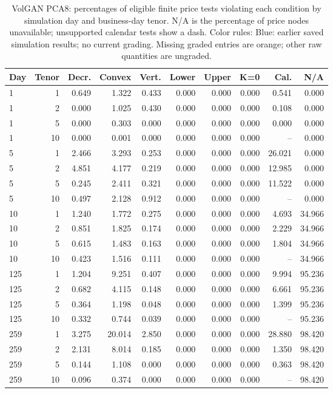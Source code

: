 \documentclass[11pt]{article}
\begin{document}
\begin{table}[H]\centering\small\setlength{\tabcolsep}{4pt}
\caption{VolGAN PCA8: percentages of eligible finite price tests violating each condition by simulation day and business-day tenor. N/A is the percentage of price nodes unavailable; unsupported calendar tests show a dash. Color rules: Blue: earlier saved simulation results; no current grading. Missing graded entries are orange; other raw quantities are ungraded.}\label{tab:literature-static-volgan}
\begin{tabular}{@{}lrrrrrrrrr@{}}
\toprule
Day & Tenor & Decr. & Convex & Vert. & Lower & Upper & K=0 & Cal. & N/A \\
\midrule
1 & 1 & 0.649 & 1.322 & 0.433 & 0.000 & 0.000 & 0.000 & 0.541 & 0.000 \\
1 & 2 & 0.000 & 1.025 & 0.430 & 0.000 & 0.000 & 0.000 & 0.108 & 0.000 \\
1 & 5 & 0.000 & 0.303 & 0.000 & 0.000 & 0.000 & 0.000 & 0.000 & 0.000 \\
1 & 10 & 0.000 & 0.001 & 0.000 & 0.000 & 0.000 & 0.000 & -- & 0.000 \\
5 & 1 & 2.466 & 3.293 & 0.253 & 0.000 & 0.000 & 0.000 & 26.021 & 0.000 \\
5 & 2 & 4.851 & 4.177 & 0.219 & 0.000 & 0.000 & 0.000 & 12.985 & 0.000 \\
5 & 5 & 0.245 & 2.411 & 0.321 & 0.000 & 0.000 & 0.000 & 11.522 & 0.000 \\
5 & 10 & 0.497 & 2.128 & 0.912 & 0.000 & 0.000 & 0.000 & -- & 0.000 \\
10 & 1 & 1.240 & 1.772 & 0.275 & 0.000 & 0.000 & 0.000 & 4.693 & 34.966 \\
10 & 2 & 0.851 & 1.825 & 0.174 & 0.000 & 0.000 & 0.000 & 2.229 & 34.966 \\
10 & 5 & 0.615 & 1.483 & 0.163 & 0.000 & 0.000 & 0.000 & 1.804 & 34.966 \\
10 & 10 & 0.423 & 1.516 & 0.111 & 0.000 & 0.000 & 0.000 & -- & 34.966 \\
125 & 1 & 1.204 & 9.251 & 0.407 & 0.000 & 0.000 & 0.000 & 9.994 & 95.236 \\
125 & 2 & 0.682 & 4.115 & 0.148 & 0.000 & 0.000 & 0.000 & 6.661 & 95.236 \\
125 & 5 & 0.364 & 1.198 & 0.048 & 0.000 & 0.000 & 0.000 & 1.399 & 95.236 \\
125 & 10 & 0.332 & 0.744 & 0.039 & 0.000 & 0.000 & 0.000 & -- & 95.236 \\
259 & 1 & 3.275 & 20.014 & 2.850 & 0.000 & 0.000 & 0.000 & 28.880 & 98.420 \\
259 & 2 & 2.131 & 8.014 & 0.185 & 0.000 & 0.000 & 0.000 & 1.350 & 98.420 \\
259 & 5 & 0.144 & 1.108 & 0.000 & 0.000 & 0.000 & 0.000 & 0.363 & 98.420 \\
259 & 10 & 0.096 & 0.374 & 0.000 & 0.000 & 0.000 & 0.000 & -- & 98.420 \\
\bottomrule\end{tabular}\end{table}
\end{document}
